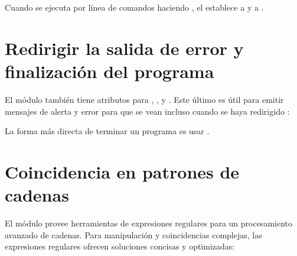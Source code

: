 \documentclass[a5paper,10pt,spanish]{sphinxmanual}
\begin{document}
\sphinxAtStartPar
Cuando se ejecuta por línea de comandos haciendo , el  establece  a  y  a .


\section{Redirigir la salida de error y finalización del programa}
\label{\detokenize{tutorial/stdlib:error-output-redirection-and-program-termination}}\label{\detokenize{tutorial/stdlib:tut-stderr}}
\sphinxAtStartPar
El módulo  también tiene atributos para , , y .  Este último es útil para emitir mensajes de alerta y error para que se vean incluso cuando se haya redirigido :

\begin{sphinxVerbatim}[commandchars=\\\{\}]
\end{sphinxVerbatim}

\sphinxAtStartPar
La forma más directa de terminar un programa es usar .


\section{Coincidencia en patrones de cadenas}
\label{\detokenize{tutorial/stdlib:string-pattern-matching}}\label{\detokenize{tutorial/stdlib:tut-string-pattern-matching}}
\sphinxAtStartPar
El módulo  provee herramientas de expresiones regulares para un procesamiento avanzado de cadenas.  Para manipulación y coincidencias complejas, las expresiones regulares ofrecen soluciones concisas y optimizadas:
\end{document}

